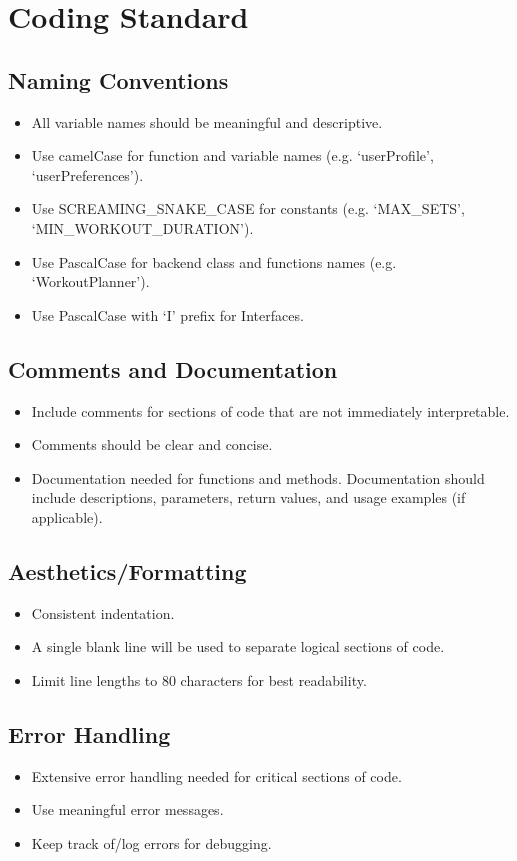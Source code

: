\documentclass{article}
\begin{document}
	\section{Coding Standard}

	\subsection{Naming Conventions}
	\begin{itemize}
		\item All variable names should be meaningful and descriptive.
		\item Use camelCase for function and variable names (e.g. ‘userProfile’, ‘userPreferences’).
		\item Use SCREAMING\_SNAKE\_CASE for constants (e.g. ‘MAX\_SETS’, ‘MIN\_WORKOUT\_DURATION’).
		\item Use PascalCase for backend class and functions names (e.g. ‘WorkoutPlanner’).
		\item Use PascalCase with ‘I’ prefix for Interfaces.
	\end{itemize}

	\subsection{Comments and Documentation}
	\begin{itemize}
		\item Include comments for sections of code that are not immediately interpretable.
		\item Comments should be clear and concise.
		\item Documentation needed for functions and methods. Documentation should include descriptions, parameters, return values, and usage examples (if applicable).
	\end{itemize}

	\subsection{Aesthetics/Formatting}
	\begin{itemize}
		\item Consistent indentation.
		\item A single blank line will be used to separate logical sections of code.
		\item Limit line lengths to 80 characters for best readability.
	\end{itemize}

	\subsection{Error Handling}
	\begin{itemize}
		\item Extensive error handling needed for critical sections of code.
		\item Use meaningful error messages.
		\item Keep track of/log errors for debugging.
	\end{itemize}
\end{document}
